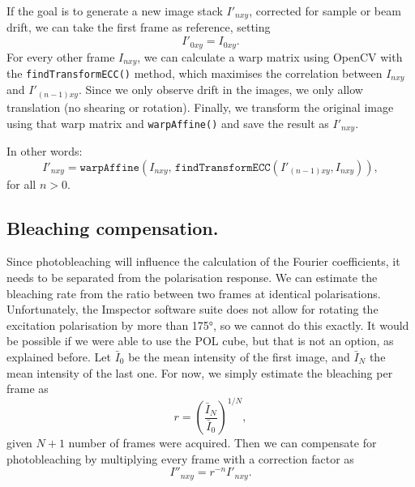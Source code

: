 If the goal is to generate a new image stack $ I'_{nxy} $, corrected for sample or beam drift, we can take the first frame as reference, setting 
\begin{equation}
	I'_{0xy} = I_{0xy}.
\end{equation}
For every other frame $ I_{nxy} $, we can calculate a warp matrix using OpenCV with the \texttt{findTransformECC()} method, which maximises the correlation between $ I_{nxy} $ and $ I'_{(n-1)xy} $. Since we only observe drift in the images, we only allow translation (no shearing or rotation). Finally, we transform the original image using that warp matrix and \texttt{warpAffine()} and save the result as $ I'_{nxy} $.

\noindent In other words:
\begin{equation}
	I'_{nxy} = \texttt{warpAffine}\left(
		I_{nxy},\,
		\texttt{findTransformECC}\left(I'_{(n-1)xy}, I_{nxy}\right)
	\right),
\end{equation}
for all $ n>0 $.

\subsection{Bleaching compensation.} Since photobleaching will influence the calculation of the Fourier coefficients, it needs to be separated from the polarisation response. We can estimate the bleaching rate from the ratio between two frames at identical polarisations. Unfortunately, the Imspector software suite does not allow for rotating the excitation polarisation by more than \ang{175}, so we cannot do this exactly. It would be possible if we were able to use the POL cube, but that is not an option, as explained before. Let $ \bar{I}_0 $ be the mean intensity of the first image, and $ \bar{I}_N $ the mean intensity of the last one. For now, we simply estimate the bleaching per frame as
\begin{equation}
	r = \left( \frac{\bar{I}_N}{\bar{I}_0} \right) ^{1/N},
\end{equation}
given $ N+1 $ number of frames were acquired. Then we can compensate for photobleaching by multiplying every frame with a correction factor as
\begin{equation}
	I''_{nxy} = r^{-n} I'_{nxy}.
\end{equation}


